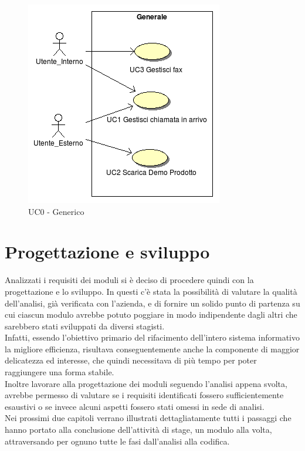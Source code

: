 \begin{figure}[!ht]
\centering
 \includegraphics[scale=0.8]{./images/UC0_Generale.png}
\caption{UC0 - Generico}
\label{UC0}
\end{figure}

\newpage
\section{Progettazione e sviluppo}
Analizzati i requisiti dei moduli si \`e deciso di procedere quindi con la progettazione e lo sviluppo. In questi c'\`e stata la possibilit\`a di valutare la qualit\`a dell'analisi, gi\`a verificata con l'azienda, e di fornire un solido punto di partenza su cui ciascun modulo avrebbe potuto poggiare in modo indipendente dagli altri che sarebbero stati sviluppati da diversi stagisti. \\
Infatti, essendo l'obiettivo primario del rifacimento dell'intero sistema informativo la migliore efficienza, risultava conseguentemente anche la componente di maggior delicatezza ed interesse, che quindi necessitava di pi\`u tempo per poter raggiungere una forma stabile. \\
Inoltre lavorare alla progettazione dei moduli seguendo l'analisi appena svolta, avrebbe permesso di valutare se i requisiti identificati fossero sufficientemente esaustivi o se invece alcuni aspetti fossero stati omessi in sede di analisi. \\
Nei prossimi due capitoli verrano illustrati dettagliatamente tutti i passaggi che hanno portato alla conclusione dell'attivit\`a di stage, un modulo alla volta, attraversando per ognuno tutte le fasi dall'analisi alla codifica.


